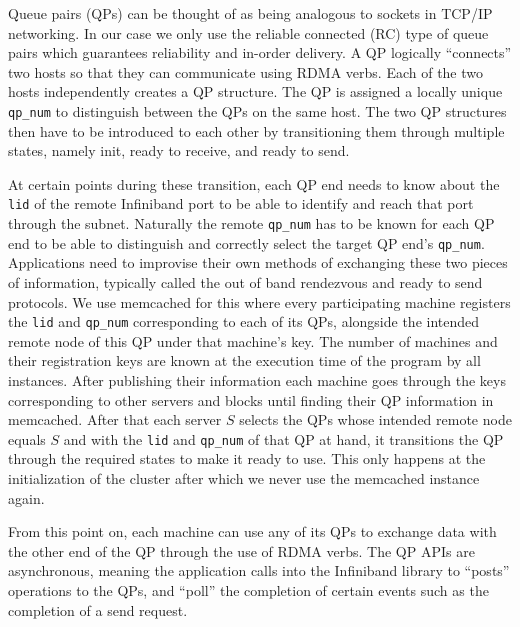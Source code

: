 Queue pairs (QPs) can be thought of as being analogous to sockets in TCP/IP
networking. In our case we only use the reliable connected (RC) type of queue
pairs which guarantees reliability and in-order delivery.
A QP logically ``connects'' two hosts so that they can communicate using
RDMA verbs. Each of the two hosts independently creates a QP structure. The
QP is assigned a locally unique \texttt{qp\_num} to distinguish between the
QPs on the same host. The two QP structures then have to be introduced to
each other by transitioning them through multiple states, namely init, ready to
receive, and ready to send.

At certain points during these transition, each
QP end needs to know about the \texttt{lid} of the remote Infiniband port to
be able to identify and reach that port through the subnet. Naturally the
remote \texttt{qp\_num} has to be known for each QP end to be able to
distinguish and correctly select the target QP end's \texttt{qp\_num}.
Applications need to improvise their own methods of exchanging these two
pieces of information, typically called the out of band rendezvous and ready to
send protocols. We use memcached for this where every participating machine
registers the \texttt{lid} and \texttt{qp\_num} corresponding to each of its
QPs, alongside the intended remote node of this QP under that machine's key.
The number of machines and their registration keys
are known at the execution time of the program by all instances. After
publishing their information each machine goes through the keys corresponding
to other servers and blocks until finding their QP information in memcached.
After that each server $S$ selects the QPs whose intended remote node equals
$S$ and with the \texttt{lid} and \texttt{qp\_num} of that QP at hand, it
transitions the QP through the required states to make it ready to use. This
only happens at the initialization of the cluster after which we never use
the memcached instance again.

From this point on, each machine can use any of its QPs to exchange data with
the other end of the QP through the use of RDMA verbs. The QP APIs are
asynchronous, meaning the application calls into the Infiniband library to
``posts'' operations to the QPs, and ``poll'' the completion of certain events
such as the completion of a send request.

